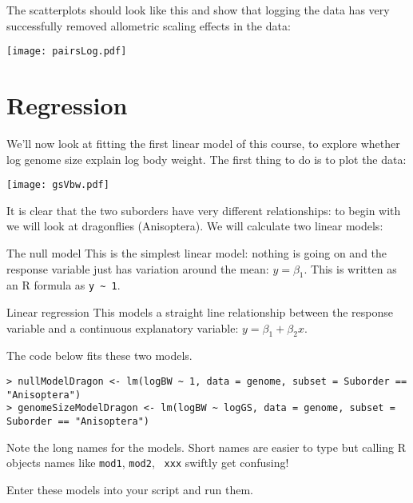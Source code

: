 The scatterplots should look like this and show that logging the data 
has very successfully removed allometric scaling effects in the data:
\begin{center}
\texttt{[image: pairsLog.pdf]} 
\end{center}

\section{Regression}

We'll now look at fitting the first linear model of this course, to 
explore whether log genome size explain log body weight. The first 
thing to do is to plot the data:

\begin{center}
	\texttt{[image: gsVbw.pdf]} 
\end{center}

It is clear that the two suborders have very different relationships: 
to begin with we will look at dragonflies (Anisoptera). We will 
calculate two linear models:

\begin{compactdesc}
	\item [The null model] This is the simplest linear model: nothing is 
	going on and the response variable just has variation around the 
	mean: $y = \beta_1$. This is written as an R formula as {\tt y 
	\textasciitilde{} 1}.
	\item [Linear regression] This models a straight line relationship 
	between the response variable and a continuous explanatory variable: 
	$y= \beta_1 + \beta_{2}x$.
\end{compactdesc}

The code below fits these two models.

\begin{lstlisting}
> nullModelDragon <- lm(logBW ~ 1, data = genome, subset = Suborder == 
"Anisoptera")
> genomeSizeModelDragon <- lm(logBW ~ logGS, data = genome, subset = 
Suborder == "Anisoptera")
\end{lstlisting}

\begin{compactitem}[$\quad\star$]
	\item Note the long names for the models. Short names are easier to 
	type but calling R objects names like {\tt mod1},  {\tt mod2},  {\tt 
	xxx} swiftly get confusing!   
	\item Enter these models into your script and run them.
\end{compactitem}

